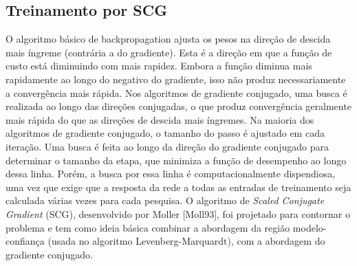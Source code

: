 \documentclass{article}
\begin{document}
\subsection{Treinamento por SCG}
O algoritmo básico de backpropagation ajusta os pesos na direção de descida mais íngreme (contrária a do gradiente). Esta é a direção em que a função de custo está diminuindo com mais rapidez. Embora a função diminua mais rapidamente ao longo do negativo do gradiente, isso não produz necessariamente a convergência mais rápida. Nos algoritmos de gradiente conjugado, uma busca é realizada ao longo das direções conjugadas, o que produz convergência geralmente mais rápida do que as direções de descida mais íngremes.
Na maioria dos algoritmos de gradiente conjugado, o tamanho do passo é ajustado em cada iteração. Uma busca é feita ao longo da direção do gradiente conjugado para determinar o tamanho da etapa, que minimiza a função de desempenho ao longo dessa linha. Porém, a busca por essa linha é computacionalmente dispendiosa, uma vez que exige que a resposta da rede a todas as entradas de treinamento seja calculada várias vezes para cada pesquisa. O algoritmo de \textit{Scaled Conjugate Gradient} (SCG), desenvolvido por Moller [Moll93], foi projetado para contornar o problema e tem como ideia básica combinar a abordagem da região modelo-confiança (usada no algoritmo Levenberg-Marquardt), com a abordagem do gradiente conjugado.
\end{document}
